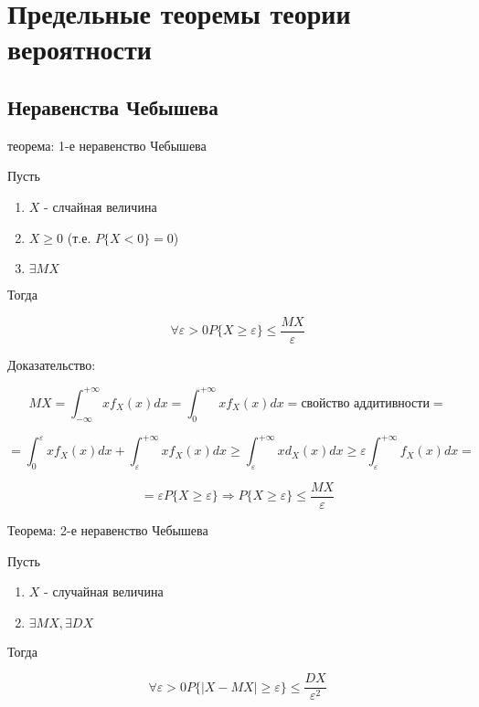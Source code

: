 \chapter{Предельные теоремы теории вероятности}

\section{Неравенства Чебышева}

теорема: 1-е неравенство Чебышева

Пусть

\begin{enumerate}
    \item $X$ - слчайная величина
    \item $X \geq 0$ (т.е. $P\{X<0\} = 0$)
    \item $\exists MX$
\end{enumerate}

Тогда

$$
\forall \varepsilon > 0 P\{X \geq \varepsilon\} \le \frac{MX}{\varepsilon}
$$

Доказательство:

\begin{equation*}
    MX = \int_{-\infty}^{+\infty} xf_X(x) dx = \int_0^{+\infty} xf_X(x) dx = \text{свойство аддитивности} =
\end{equation*}

\begin{equation*}
    = \int_{0}^\varepsilon xf_X(x) dx + \int_\varepsilon^{+\infty} xf_X(x) dx \geq \int_\varepsilon^{+\infty} xd_X(x) dx \geq \varepsilon \int_\varepsilon^{+\infty} f_X(x) dx =
\end{equation*}

\begin{equation*}
    = \varepsilon P\{ X \geq \varepsilon \} \Rightarrow P\{ X \geq \varepsilon \} \le \frac{MX}{\varepsilon}
\end{equation*}

Теорема: 2-е неравенство Чебышева

Пусть

\begin{enumerate}
    \item $X$ - случайная величина
    \item $\exists MX, \exists DX$
\end{enumerate}

Тогда

\begin{equation*}
    \forall \varepsilon > 0 P\{ |X - MX | \geq \varepsilon\} \le \frac{DX}{\varepsilon^2}
\end{equation*}

